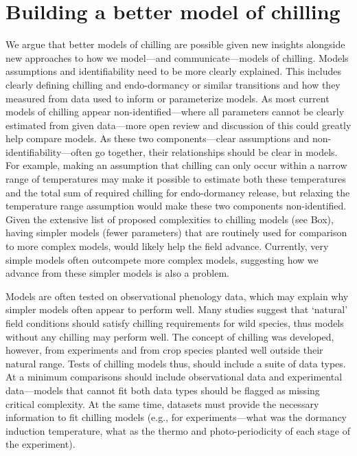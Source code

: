 \documentclass[11pt]{article}
\begin{document}
\section*{Building a better model of chilling} %

We argue that better models of chilling are possible given new insights alongside new approaches to how we model---and communicate---models of chilling. Models assumptions and identifiability need to be more clearly explained. This includes clearly defining chilling and endo-dormancy or similar transitions and how they measured from data used to inform or parameterize models. As most current models of chilling appear non-identified---where all parameters cannot be clearly estimated from given data---more open review and discussion of this could greatly help compare models. As these two components---clear assumptions and non-identifiability---often go together, their relationships should be clear in models. For example, making an assumption that chilling can only occur within a narrow range of temperatures may make it possible to estimate both these temperatures and the total sum of required chilling for endo-dormancy release, but relaxing the temperature range assumption would make these two components non-identified. Given the extensive list of proposed complexities to chilling models (see Box), having simpler models (fewer parameters) that are routinely used for comparison to more complex models, would likely help the field advance. Currently, very simple models often outcompete more complex models, suggesting how we advance from these simpler models is also a problem.

Models are often tested on observational phenology data, which may explain why simpler models often appear to perform well. Many studies suggest that `natural' field conditions should satisfy chilling requirements for wild species, thus models without any chilling may perform well. The concept of chilling was developed, however, from experiments and from crop species planted well outside their natural range. Tests of chilling models thus, should include a suite of data types. At a minimum comparisons should include observational data and experimental data---models that cannot fit both data types should be flagged as missing critical complexity.  At the same time, datasets must provide the necessary information to fit chilling models (e.g., for experiments---what was the dormancy induction temperature, what as the thermo and photo-periodicity of each stage of the experiment). 
\end{document}
